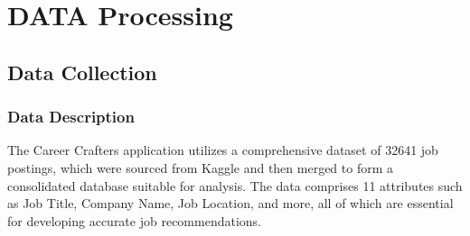 \documentclass[a4paper,10pt]{article}
\begin{document}





\section{DATA Processing}

\subsection{Data Collection}

    \subsubsection{Data Description}
    The Career Crafters application utilizes a comprehensive dataset of 32641 job postings, which were sourced from Kaggle and then merged to form a consolidated database suitable for analysis. The data comprises 11 attributes such as Job Title, Company Name, Job Location, and more, all of which are essential for developing accurate job recommendations.
\end{document}
